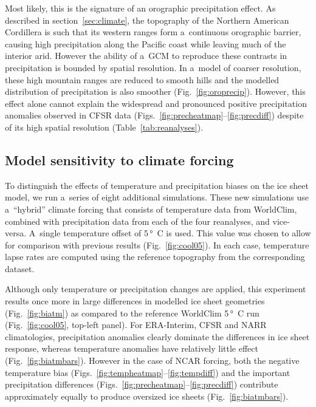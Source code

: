 \documentclass[tc, ms]{copernicus}
\begin{document}
Most likely, this is the signature of an orographic precipitation effect. As described in section~\ref{sec:climate}, the topography of the Northern American Cordillera is such that its western ranges form a~continuous orographic barrier, causing high precipitation along the Pacific coast while leaving much of the interior arid. However the ability of a~GCM to reproduce these contrasts in precipitation is bounded by spatial resolution. In a~model of coarser resolution, these high mountain ranges are reduced to smooth hills and the modelled distribution of precipitation is also smoother (Fig.~\ref{fig:oroprecip}). However, this effect alone cannot explain the widespread and pronounced positive precipitation anomalies observed in CFSR data (Figs.~\ref{fig:precheatmap}--\ref{fig:precdiff}) despite of its high spatial resolution (Table~\ref{tab:reanalyses}).

\subsection{Model sensitivity to climate forcing}

To distinguish the effects of temperature and precipitation biases on the ice sheet model, we run a~series of eight additional simulations. These new simulations use a~“hybrid” climate forcing that consists of temperature data from WorldClim, combined with precipitation data from each of the four reanalyses, and vice-versa. A~single temperature offset of 5\,\unit{\degree C} is used. This value was chosen to allow for comparison with previous results (Fig.~\ref{fig:cool05}). In each case, temperature lapse rates are computed using the reference topography from the corresponding dataset.

Although only temperature or precipitation changes are applied, this experiment results once more in large differences in modelled ice sheet geometries (Fig.~\ref{fig:biatm}) as compared to the reference WorldClim 5\,\unit{\degree C} run (Fig.~\ref{fig:cool05}, top-left panel). For ERA-Interim, CFSR and NARR climatologies, precipitation anomalies clearly dominate the differences in ice sheet response, whereas temperature anomalies have relatively little effect (Fig.~\ref{fig:biatmbars}). However in the case of NCAR forcing, both the negative temperature bias (Figs.~\ref{fig:tempheatmap}--\ref{fig:tempdiff}) and the important precipitation differences (Figs.~\ref{fig:precheatmap}--\ref{fig:precdiff}) contribute approximately equally to produce oversized ice sheets (Fig.~\ref{fig:biatmbars}).
\end{document}

